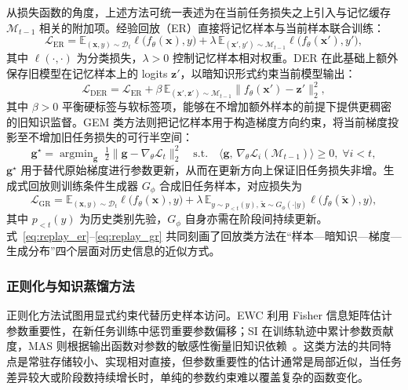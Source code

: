 从损失函数的角度，上述方法可统一表述为在当前任务损失之上引入与记忆缓存 $\mathcal{M}_{t-1}$ 相关的附加项。经验回放（ER）直接将记忆样本与当前样本联合训练：
\begin{equation}
\mathcal{L}_{\mathrm{ER}}=\mathbb{E}_{(\mathbf{x},y)\sim\mathcal{D}_t}\ell\bigl(f_\theta(\mathbf{x}),y\bigr)+\lambda\,\mathbb{E}_{(\mathbf{x}',y')\sim\mathcal{M}_{t-1}}\ell\bigl(f_\theta(\mathbf{x}'),y'\bigr),
\label{eq:replay_er}
\end{equation}
其中 $\ell(\cdot,\cdot)$ 为分类损失，$\lambda>0$ 控制记忆样本相对权重。DER 在此基础上额外保存旧模型在记忆样本上的 logits $\mathbf{z}'$，以暗知识形式约束当前模型输出：
\begin{equation}
\mathcal{L}_{\mathrm{DER}}=\mathcal{L}_{\mathrm{ER}}+\beta\,\mathbb{E}_{(\mathbf{x}',\mathbf{z}')\sim\mathcal{M}_{t-1}}\bigl\|f_\theta(\mathbf{x}')-\mathbf{z}'\bigr\|_2^2,
\label{eq:replay_der}
\end{equation}
其中 $\beta>0$ 平衡硬标签与软标签项，能够在不增加额外样本的前提下提供更稠密的旧知识监督。GEM 类方法则把记忆样本用于构造梯度方向约束，将当前梯度投影至不增加旧任务损失的可行半空间：
\begin{equation}
\mathbf{g}^{\star}=\mathop{\arg\min}_{\mathbf{g}}\;\tfrac{1}{2}\bigl\|\mathbf{g}-\nabla_\theta\mathcal{L}_t\bigr\|_2^2\quad\text{s.t.}\quad \bigl\langle\mathbf{g},\,\nabla_\theta\mathcal{L}_i(\mathcal{M}_{t-1})\bigr\rangle\ge 0,\;\forall i<t,
\label{eq:gem}
\end{equation}
$\mathbf{g}^{\star}$ 用于替代原始梯度进行参数更新，从而在更新方向上保证旧任务损失非增。生成式回放则训练条件生成器 $G_\phi$ 合成旧任务样本，对应损失为
\begin{equation}
\mathcal{L}_{\mathrm{GR}}=\mathbb{E}_{(\mathbf{x},y)\sim\mathcal{D}_t}\ell\bigl(f_\theta(\mathbf{x}),y\bigr)+\lambda\,\mathbb{E}_{y\sim p_{<t}(y),\,\tilde{\mathbf{x}}\sim G_\phi(\cdot|y)}\ell\bigl(f_\theta(\tilde{\mathbf{x}}),y\bigr),
\label{eq:replay_gr}
\end{equation}
其中 $p_{<t}(y)$ 为历史类别先验，$G_\phi$ 自身亦需在阶段间持续更新。式~\eqref{eq:replay_er}--\eqref{eq:replay_gr} 共同刻画了回放类方法在“样本—暗知识—梯度—生成分布”四个层面对历史信息的近似方式。

\subsubsection{正则化与知识蒸馏方法}

正则化方法试图用显式约束代替历史样本访问。EWC 利用 Fisher 信息矩阵估计参数重要性，在新任务训练中惩罚重要参数偏移；SI 在训练轨迹中累计参数贡献度，MAS 则根据输出函数对参数的敏感性衡量旧知识依赖~\citep{kirkpatrick2017ewc,zenke2017continual,aljundi2018memory}。这类方法的共同特点是常驻存储较小、实现相对直接，但参数重要性的估计通常是局部近似，当任务差异较大或阶段数持续增长时，单纯的参数约束难以覆盖复杂的函数变化。

